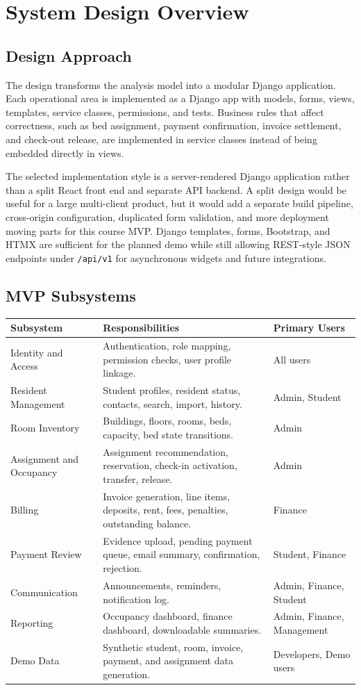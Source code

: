 \documentclass[11pt,a4paper]{article}
\begin{document}
\section{System Design Overview}

\subsection{Design Approach}
The design transforms the analysis model into a modular Django application. Each operational area is implemented as a Django app with models, forms, views, templates, service classes, permissions, and tests. Business rules that affect correctness, such as bed assignment, payment confirmation, invoice settlement, and check-out release, are implemented in service classes instead of being embedded directly in views.

The selected implementation style is a server-rendered Django application rather than a split React front end and separate API backend. A split design would be useful for a large multi-client product, but it would add a separate build pipeline, cross-origin configuration, duplicated form validation, and more deployment moving parts for this course MVP. Django templates, forms, Bootstrap, and HTMX are sufficient for the planned demo while still allowing REST-style JSON endpoints under \texttt{/api/v1} for asynchronous widgets and future integrations.

\subsection{MVP Subsystems}

\begin{longtable}{L{0.22\textwidth} L{0.44\textwidth} L{0.22\textwidth}}
\toprule
\textbf{Subsystem} & \textbf{Responsibilities} & \textbf{Primary Users}\\
\midrule
\endhead
Identity and Access & Authentication, role mapping, permission checks, user profile linkage. & All users\\
Resident Management & Student profiles, resident status, contacts, search, import, history. & Admin, Student\\
Room Inventory & Buildings, floors, rooms, beds, capacity, bed state transitions. & Admin\\
Assignment and Occupancy & Assignment recommendation, reservation, check-in activation, transfer, release. & Admin\\
Billing & Invoice generation, line items, deposits, rent, fees, penalties, outstanding balance. & Finance\\
Payment Review & Evidence upload, pending payment queue, email summary, confirmation, rejection. & Student, Finance\\
Communication & Announcements, reminders, notification log. & Admin, Finance, Student\\
Reporting & Occupancy dashboard, finance dashboard, downloadable summaries. & Admin, Finance, Management\\
Demo Data & Synthetic student, room, invoice, payment, and assignment data generation. & Developers, Demo users\\
\bottomrule
\end{longtable}
\end{document}
